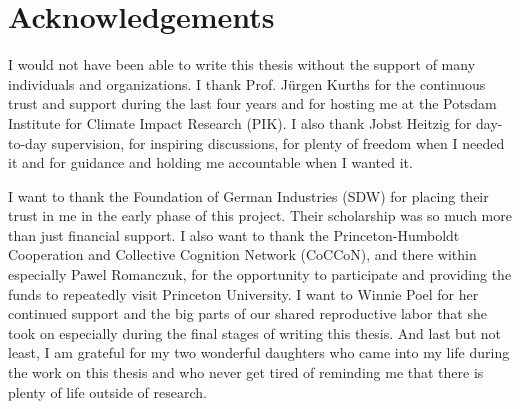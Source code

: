 
\chapter*{Acknowledgements}

I would not have been able to write this thesis without the support of many individuals and organizations.
I thank Prof. J\"{u}rgen Kurths for the continuous trust and support during the last four years and for hosting me at the Potsdam Institute for Climate Impact Research (PIK). I also thank Jobst Heitzig for day-to-day supervision, for inspiring discussions, for plenty of freedom when I needed it and for guidance and holding me accountable when I wanted it.


I want to thank the Foundation of German Industries (SDW) for placing their trust in me in the early phase of this project. Their scholarship was so much more than just financial support.
I also want to thank the Princeton-Humboldt Cooperation and Collective Cognition Network (CoCCoN), and there within especially Pawel Romanczuk, for the opportunity to participate and providing the funds to repeatedly visit Princeton University.
I want to Winnie Poel for her continued support and the big parts of our shared reproductive labor that she took on especially during the final stages of writing this thesis.
And last but not least, I am grateful for my two wonderful daughters who came into my life during the work on this thesis and who never get tired of reminding me that there is plenty of life outside of research.
